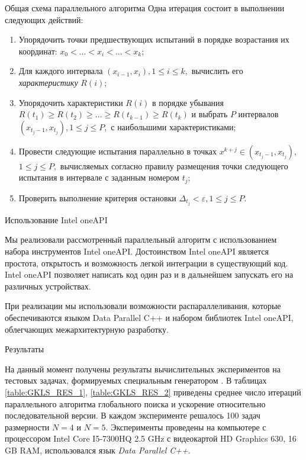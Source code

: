 \documentclass{beamer}
\begin{document}
\begin{frame}[t]
\begin{columns}[t]
\begin{column}[t]{0.47\paperwidth}
\begin{block}{Общая схема параллельного алгоритма}
Одна итерация состоит в выполнении следующих действий:
              \begin{enumerate}
                \justifying
                \item Упорядочить точки предшествующих испытаний в порядке возрастания их координат: \(x_{0}<...<x_{i}<...<x_{k}\);
                \item Для каждого интервала \((x_{i-1}, x_{i}),1\leqslant i\leqslant k,\) вычислить его \textit{характеристику} \(R(i)\);
                \item Упорядочить характеристики \(R(i)\) в порядке убывания \(R(t_{1})\geqslant R(t_{2})\geqslant ... \geqslant  R(t_{k-1})\geqslant R(t_{k})\) и выбрать \(P\) интервалов \((x_{t_j-1}, x_{t_j}), 1\leqslant j \leqslant P,\) с наибольшими характеристиками;
                \item Провести следующие испытания параллельно в точках  \(x^{k+j} \in (x_{t_j-1}, x_{t_j})\), \(1\leqslant j \leqslant P,\) вычисляемых согласно правилу размещения точки следующего испытания в интервале с заданным номером \(t_j\);
                \item Проверить выполнение критерия остановки \(\Delta_{t_j}<\varepsilon, 1\leqslant j \leqslant P\).
              \end{enumerate}

\end{block}

\begin{block}{Использование Intel oneAPI}

Мы реализовали рассмотренный параллельный алгоритм с использованием набора инструментов Intel oneAPI. Достоинством Intel oneAPI является простота, открытость и возможность легкой интеграции в существующий код. Intel oneAPI позволяет написать код один раз и в дальнейшем запускать его на различных устройствах. 

При реализации мы использовали возможности распараллеливания, которые обеспечиваются языком Data Parallel C++ и набором библиотек Intel oneAPI, облегчающих межархитектурную разработку.   


\end{block}

\begin{block}{Результаты}

На данный момент получены результаты вычислительных экспериментов на тестовых задачах, формируемых специальным генератором \cite{GKLS}. В таблицах \ref{table:GKLS_RES_1}, \ref{table:GKLS_RES_2} приведены среднее число итераций параллельного алгоритма глобального поиска и ускорение относительно последовательной версии. В каждом эксперименте решалось 100 задач размерности \(N = 4\) и \(N = 5\). Эксперименты проведены на компьютере с процессором Intel Core I5-7300HQ 2.5 GHz с видеокартой HD Graphics 630, 16 GB RAM, использовался язык \textit{Data Parallel C++}.



\end{block}
\end{column}
\end{columns}
\end{frame}
\end{document}
